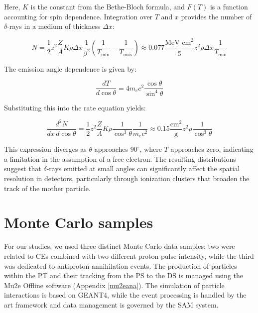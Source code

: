 Here, $K$ is the constant from the Bethe-Bloch formula, 
and $F(T)$ is a function accounting for spin dependence. 
Integration over $T$ and $x$ provides the number of $\delta$-rays in a medium of thickness $\Delta x$:

\begin{equation}
N = \frac{1}{2} z^2 \frac{Z}{A} K \rho \Delta x \frac{1}{\beta^2} \left(\frac{1}{T_{\text{min}}} - \frac{1}{T_{\text{max}}}\right) \approx 0.077 \frac{\text{MeV cm}^2}{\text{g}} z^2 \rho \Delta x \frac{1}{T_{\text{min}}}
\end{equation}

The emission angle dependence is given by:

\begin{equation}
\frac{dT}{d \cos \theta} = 4 m_e c^2 \frac{\cos \theta}{\sin^4 \theta}
\end{equation}

Substituting this into the rate equation yields:

\begin{equation}
\frac{d^2 N}{dx \, d \cos \theta} = \frac{1}{2} z^2 \frac{Z}{A} K \rho \frac{1}{\cos^3 \theta} \frac{1}{m_e c^2} \approx 0.15 \frac{\text{cm}^2}{\text{g}} z^2 \rho \frac{1}{\cos^3 \theta}
\end{equation}

This expression diverges as $\theta$ approaches $90^\circ$, 
where $T$ approaches zero, indicating a limitation in the 
assumption of a free electron. The resulting distributions 
suggest that $\delta$-rays emitted at small angles can 
significantly affect the spatial resolution in detectors, 
particularly through ionization clusters that broaden the 
track of the mother particle.



\section{Monte Carlo samples}\label{datasample}
For our studies, we used three distinct Monte Carlo data samples: two were 
related to CEs combined with two different proton pulse intensity, while the third was 
dedicated to antiproton annihilation events. The production of particles within 
the PT and their tracking from the PS to the DS is managed using the Mu2e Offline software 
(Appendix \ref{mu2eana}). The simulation of particle interactions is based on 
GEANT4, while the event processing is handled by the art framework and data 
management is governed by the SAM system.

